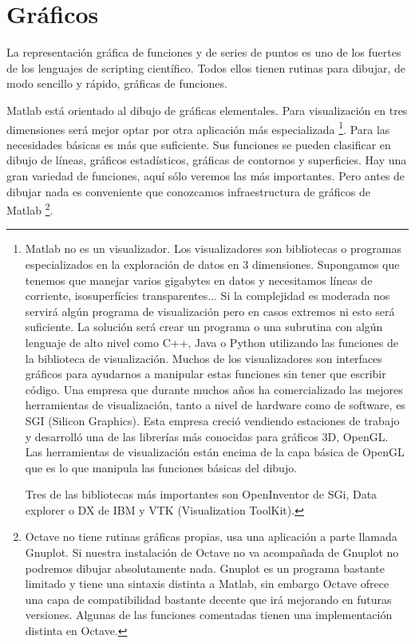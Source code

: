 

\chapter{Gráficos}


La representación gráfica de funciones y de series de puntos es uno
de los fuertes de los lenguajes de scripting científico. Todos ellos
tienen rutinas para dibujar, de modo sencillo y rápido, gráficas de
funciones.

Matlab está orientado al dibujo de gráficas elementales. Para visualización
en tres dimensiones será mejor optar por otra aplicación más especializada%
\footnote{Matlab no es un visualizador. Los visualizadores son bibliotecas o
programas especializados en la exploración de datos en 3 dimensiones.
Supongamos que tenemos que manejar varios gigabytes en datos y necesitamos
líneas de corriente, isosuperfícies transparentes... Si la complejidad
es moderada nos servirá algún programa de visualización pero en casos
extremos ni esto será suficiente. La solución será crear un programa
o una subrutina con algún lenguaje de alto nivel como C++, Java o
Python utilizando las funciones de la biblioteca de visualización.
Muchos de los visualizadores son interfaces gráficos para ayudarnos
a manipular estas funciones sin tener que escribir código. Una empresa
que durante muchos años ha comercializado las mejores herramientas
de visualización, tanto a nivel de hardware como de software, es SGI
(Silicon Graphics). Esta empresa creció vendiendo estaciones de trabajo
y desarrolló una de las librerías más conocidas para gráficos 3D,
OpenGL. Las herramientas de visualización están encima de la capa
básica de OpenGL que es lo que manipula las funciones básicas del
dibujo.

Tres de las bibliotecas más importantes son OpenInventor de SGi, Data
explorer o DX de IBM y VTK (Visualization ToolKit). %
}. Para las necesidades básicas es más que suficiente. Sus funciones
se pueden clasificar en dibujo de líneas, gráficos estadísticos, gráficas
de contornos y superficies. Hay una gran variedad de funciones, aquí
sólo veremos las más importantes. Pero antes de dibujar nada es conveniente
que conozcamos infraestructura de gráficos de Matlab%
\footnote{Octave no tiene rutinas gráficas propias, usa una aplicación a parte
llamada Gnuplot. Si nuestra instalación de Octave no va acompañada
de Gnuplot no podremos dibujar absolutamente nada. Gnuplot es un programa
bastante limitado y tiene una sintaxis distinta a Matlab, sin embargo
Octave ofrece una capa de compatibilidad bastante decente que irá
mejorando en futuras versiones. Algunas de las funciones comentadas
tienen una implementación distinta en Octave.%
}.


